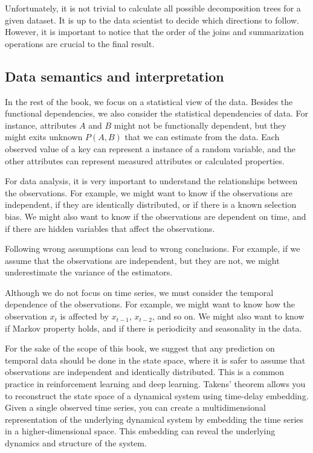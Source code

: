 Unfortunately, it is not trivial to calculate all possible decomposition trees for a given
dataset.  It is up to the data scientist to decide which directions to follow.  However,
it is important to notice that the order of the joins and summarization operations are
crucial to the final result.

\subsection{Data semantics and interpretation}

In the rest of the book, we focus on a statistical view of the data.  Besides the
functional dependencies, we also consider the statistical dependencies of data.  For
instance, attributes $A$ and $B$ might not be functionally dependent, but they might exits
unknown $P(A, B)$ that we can estimate from the data.  Each observed value of a key can
represent a instance of a random variable, and the other attributes can represent
measured attributes or calculated properties.

For data analysis, it is very important to understand the relationships between the
observations.  For example, we might want to know if the observations are independent, if
they are identically distributed, or if there is a known selection bias.  We might also
want to know if the observations are dependent on time, and if there are hidden variables
that affect the observations.

Following wrong assumptions can lead to wrong conclusions.  For example, if we assume that
the observations are independent, but they are not, we might underestimate the variance of
the estimators.

Although we do not focus on time series, we must consider the temporal dependence of the
observations.  For example, we might want to know how the observation $x_t$ is affected by
$x_{t-1}$, $x_{t-2}$, and so on.  We might also want to know if Markov property holds,
and if there is periodicity and seasonality in the data.

For the sake of the scope of this book, we suggest that any prediction on temporal data
should be done in the state space, where it is safer to assume that observations are
independent and identically distributed.  This is a common practice in reinforcement
learning and deep learning. Takens' theorem allows you to
reconstruct the state space of a dynamical system using time-delay embedding. Given a
single observed time series, you can create a multidimensional representation of the
underlying dynamical system by embedding the time series in a higher-dimensional space.
This embedding can reveal the underlying dynamics and structure of the system.

